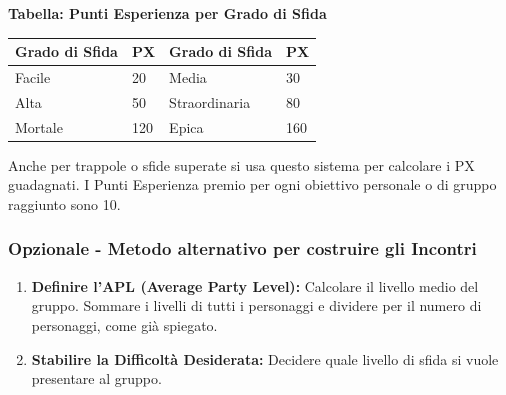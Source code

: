 \begin{multicols}{2}
\medskip

\textbf{Tabella: Punti Esperienza per Grado di Sfida}

\medskip

\noindent\begin{tabularx}{\linewidth}{ll|ll}
\toprule
\rowcolor{gray!20}\textbf{Grado di Sfida} & \textbf{PX}&\textbf{Grado di Sfida} & \textbf{PX}\\
\toprule
Facile& 20& Media& 30\\
\rowcolor{gray!20}Alta& 50& Straordinaria& 80\\
Mortale& 120& Epica& 160
\end{tabularx}

\medskip

Anche per trappole o sfide superate si usa questo sistema per calcolare i PX guadagnati. I Punti Esperienza premio per ogni obiettivo personale o di gruppo raggiunto sono 10.

\subsubsection{Opzionale - Metodo alternativo per costruire gli Incontri}

\begin{enumerate}[leftmargin=*] \setlength{\itemsep}{0pt}

\item \textbf{Definire l'APL (Average Party Level):} Calcolare il livello medio del gruppo. Sommare i livelli di tutti i personaggi e dividere per il numero di personaggi, come già spiegato.


\item \textbf{Stabilire la Difficoltà Desiderata:} Decidere quale livello di sfida si vuole presentare al gruppo.



\end{enumerate}
\end{multicols}
